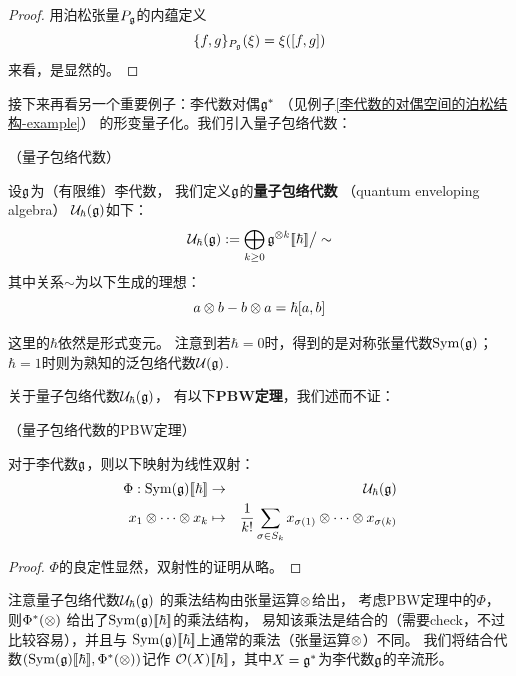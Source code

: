 \begin{proof}
用泊松张量$P_{\mathfrak{g}}$的内蕴定义
$$\{f,g\}_{P_{\mathfrak{g}}}(\xi)=\xi([f,g])$$
来看，是显然的。
\end{proof}

接下来再看另一个重要例子：李代数对偶$\mathfrak{g}^*$
（见例子\ref{李代数的对偶空间的泊松结构-example}）
的形变量子化。我们引入量子包络代数：

\begin{definition}（量子包络代数）

设$\mathfrak{g}$为（有限维）李代数，
我们定义$\mathfrak{g}$的\textbf{量子包络代数}
（quantum enveloping algebra）
$\mathcal{U}_{\hbar}(\mathfrak{g})$如下：
$$\mathcal{U}_{\hbar}(\mathfrak{g}):=
\bigoplus_{k\geq 0}\mathfrak{g}^{\otimes k}[\![\hbar]\!]\big/\sim$$
其中关系$\sim$为以下生成的理想：
$$a\otimes b-b\otimes a=\hbar[a,b]$$
\end{definition}
这里的$\hbar$依然是形式变元。
注意到若$\hbar=0$时，得到的是对称张量代数$\operatorname{Sym}(\mathfrak{g})$；
$\hbar=1$时则为熟知的泛包络代数$\mathcal{U}(\mathfrak{g})$.


关于量子包络代数$\mathcal{U}_{\hbar}(\mathfrak{g})$，
有以下\textbf{PBW定理}，我们述而不证：

\begin{prop}（量子包络代数的PBW定理）

对于李代数$\mathfrak{g}$，则以下映射为线性双射：
\begin{eqnarray*}
\Phi:\operatorname{Sym}(\mathfrak{g})[\![\hbar]\!] &\to& \mathcal{U}_{\hbar}(\mathfrak{g})\\
x_1\otimes\cdots\otimes x_k &\mapsto&
\frac{1}{k!}
\sum_{\sigma\in S_k}
x_{\sigma(1)}\otimes\cdots\otimes x_{\sigma(k)}
\end{eqnarray*}
\end{prop}


\begin{proof}
$\Phi$的良定性显然，双射性的证明从略。
\end{proof}

注意量子包络代数$\mathcal{U}_{\hbar}(\mathfrak{g})$
的乘法结构由张量运算$\otimes$给出，
考虑PBW定理中的$\Phi$，则$\Phi^*(\otimes)$
给出了$\operatorname{Sym}(\mathfrak{g})[\![\hbar]\!]$的乘法结构，
易知该乘法是结合的（需要check，不过比较容易），并且与
$\operatorname{Sym}(\mathfrak{g})[\![\hbar]\!]$上通常的乘法（张量运算$\otimes$）不同。
我们将结合代数$(\operatorname{Sym}(\mathfrak{g})[\![\hbar]\!],\Phi^*(\otimes))$记作
$\mathcal{O}(X)[\![\hbar]\!]$，其中$X=\mathfrak{g}^*$为李代数$\mathfrak{g}$的辛流形。


